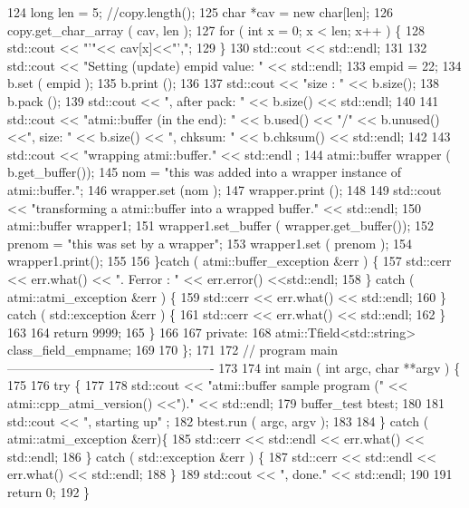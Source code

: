 \begin{DoxyCodeInclude}
124         long len = 5;                  //copy.length();
125         char *cav = new char[len];
126         copy.get\_char\_array ( cav, len );
127         for ( int x = 0; x < len; x++ ) \{
128           std::cout << "'"<< cav[x]<<"',";
129         \}
130         std::cout << std::endl;
131 
132         std::cout << "Setting (update) empid value: " << std::endl;
133         empid = 22;
134         b.set ( empid );
135         b.print ();
136 
137         std::cout << "size : " << b.size();
138         b.pack ();
139         std::cout << ", after pack: " << b.size() << std::endl;
140 
141         std::cout << "atmi::buffer (in the end): " << b.used() << "/" << b.unused() <<", size: " <<
       b.size() << ", chksum: " << b.chksum() <<  std::endl;
142 
143         std::cout << "wrapping atmi::buffer." << std::endl ;
144         atmi::buffer wrapper ( b.get\_buffer());
145         nom = "this was added into a wrapper instance of atmi::buffer.";
146         wrapper.set (nom );
147         wrapper.print ();
148 
149         std::cout << "transforming a atmi::buffer into a wrapped buffer." << std::endl;
150         atmi::buffer wrapper1;
151         wrapper1.set\_buffer ( wrapper.get\_buffer());
152         prenom = "this was set by a wrapper";
153         wrapper1.set ( prenom );
154         wrapper1.print();
155 
156       \}catch ( atmi::buffer\_exception &err ) \{
157         std::cerr << err.what() << ". Ferror : " << err.error() <<std::endl;
158       \} catch ( atmi::atmi\_exception &err ) \{
159         std::cerr << err.what() << std::endl;
160       \} catch ( std::exception &err ) \{
161         std::cerr << err.what() << std::endl;
162       \}
163 
164       return 9999;
165     \}
166 
167   private:
168     atmi::Tfield<std::string> class\_field\_empname;
169 
170 \};
171 
172 // program main -------------------------------------------------
173 
174 int main ( int argc, char **argv ) \{
175 
176   try \{
177 
178     std::cout << "atmi::buffer sample program (" << atmi::cpp\_atmi\_version() <<")." << std::endl;
179     buffer\_test btest;
180 
181     std::cout << ", starting up" ;
182     btest.run ( argc, argv );
183 
184   \} catch ( atmi::atmi\_exception &err)\{
185     std::cerr << std::endl << err.what() << std::endl;
186   \} catch ( std::exception &err ) \{
187     std::cerr << std::endl << err.what() << std::endl;
188   \}
189   std::cout << ", done." << std::endl;
190 
191   return 0;
192 \}
\end{DoxyCodeInclude}
 